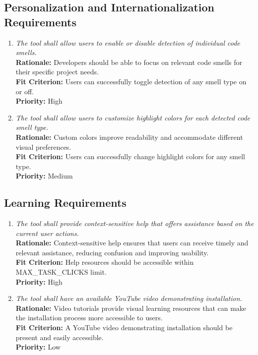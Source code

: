 \documentclass[12pt]{article}
\begin{document}
\subsection{Personalization and Internationalization Requirements}
\begin{enumerate}[label=UHR-PSI \arabic*., wide=0pt, leftmargin=*]
  \item \emph{The tool shall allow users to enable or disable detection of individual code smells.}
  \\[2mm]
  {\bf Rationale:} Developers should be able to focus on relevant code smells for their specific project needs.\\
  {\bf Fit Criterion:} Users can successfully toggle detection of any smell type on or off.\\
  {\bf Priority:} High
  
  \item \emph{The tool shall allow users to customize highlight colors for each detected code smell type.}
  \\[2mm]
  {\bf Rationale:} Custom colors improve readability and accommodate different visual preferences.\\
  {\bf Fit Criterion:} Users can successfully change highlight colors for any smell type.\\
  {\bf Priority:} Medium
\end{enumerate}

\subsection{Learning Requirements}
\begin{enumerate}[label=UHR-LRN \arabic*., wide=0pt, leftmargin=*]
  \item \emph{The tool shall provide context-sensitive help that
    offers assistance based on the current user actions.}\\[2mm]
    {\bf Rationale:} Context-sensitive help ensures that users can
    receive timely and relevant assistance, reducing confusion and
    improving usability.\\
    {\bf Fit Criterion:} Help resources should be accessible within
    MAX\_TASK\_CLICKS limit.\\
    {\bf Priority:} High
  \item \emph{The tool shall have an available YouTube video
    demonstrating installation.}\\[2mm]
    {\bf Rationale:} Video tutorials provide visual learning
    resources that can make the installation process more accessible to users.\\
    {\bf Fit Criterion:} A YouTube video demonstrating installation
    should be present and easily accessible.\\
    {\bf Priority:} Low
\end{enumerate}
\end{document}
